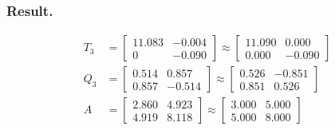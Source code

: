 \subsubsection{Result.}
\begin{align*}
    T_3 &=
    \begin{bmatrix}
        11.083 & -0.004\\
        0 & -0.090
    \end{bmatrix} \approx \begin{bmatrix}
        11.090 & 0.000\\
        0.000 & -0.090
    \end{bmatrix}\\
    Q_3 &=
    \begin{bmatrix}
        0.514 & 0.857\\
        0.857 & -0.514
    \end{bmatrix}\approx\begin{bmatrix}
        0.526 & -0.851\\
        0.851 & 0.526
    \end{bmatrix}\\
    A &=
    \begin{bmatrix}
        2.860 & 4.923\\
        4.919 & 8.118
    \end{bmatrix}\approx\begin{bmatrix}
        3.000 & 5.000\\
        5.000 & 8.000
    \end{bmatrix}
\end{align*}

